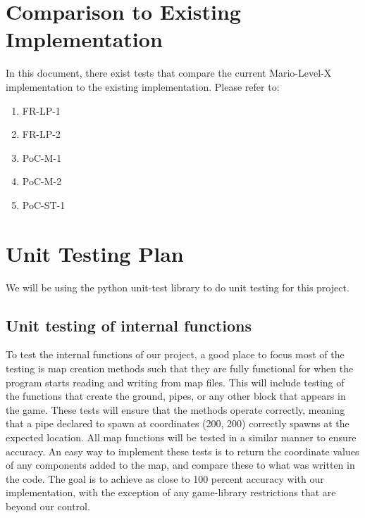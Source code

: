 \documentclass[12pt, titlepage]{article}
\begin{document}
\color{Black}
\section{Comparison to Existing Implementation}	
\color{Red}
In this document, there exist tests that compare the current Mario-Level-X implementation to the existing implementation. Please refer to:

\begin{enumerate}
    \item FR-LP-1
    \item FR-LP-2
    \item PoC-M-1
    \item PoC-M-2
    \item PoC-ST-1
\end{enumerate}

\color{Black}
				
\section{Unit Testing Plan}
	We will be using the python unit-test library to do unit testing for this project.
\subsection{Unit testing of internal functions}
	To test the internal functions of our project, a good place to focus most of the testing is map creation methods such that they are fully functional for when the program starts reading and writing from map files. This will include testing of the functions that create the ground, pipes, or any other block that appears in the game. These tests will ensure that the methods operate correctly, meaning that a pipe declared to spawn at coordinates (200, 200) correctly spawns at the expected location. All map functions will be tested in a similar manner to ensure accuracy. An easy way to implement these tests is to return the coordinate values of any components added to the map, and compare these to what was written in the code. The goal is to achieve as close to 100 percent accuracy with our implementation, with the exception of any game-library restrictions that are beyond our control.
	
\end{document}
